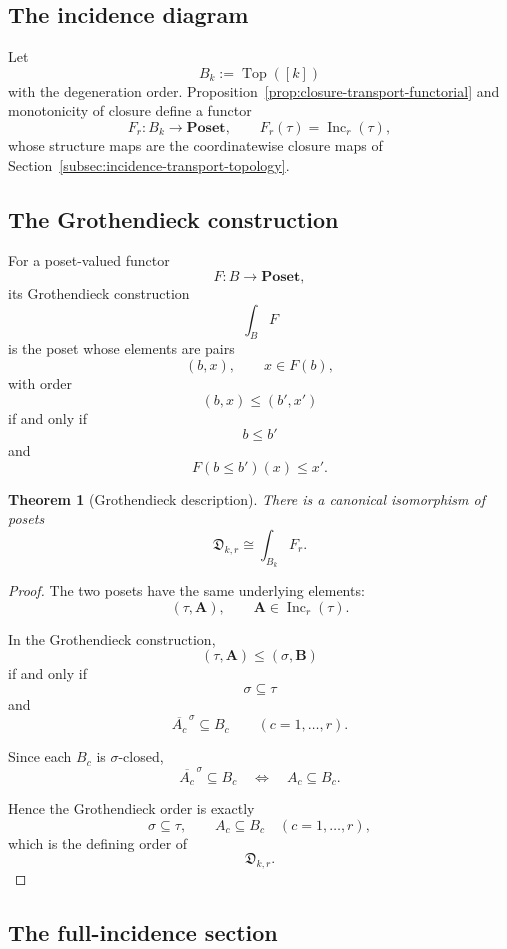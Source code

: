 \documentclass[11pt]{article}
\theoremstyle{plain}
\newtheorem{theorem}{Theorem}[section]
\theoremstyle{definition}
\begin{document}
\subsection{The incidence diagram}
\label{subsec:incidence-diagram}

Let
\[
B_k:=\operatorname{Top}([k])
\]
with the degeneration order.  Proposition~\ref{prop:closure-transport-functorial}
and monotonicity of closure define a functor
\[
F_r:B_k\longrightarrow\mathbf{Poset},
\qquad
F_r(\tau)=\operatorname{Inc}_r(\tau),
\]
whose structure maps are the coordinatewise closure maps of
Section~\ref{subsec:incidence-transport-topology}.

\subsection{The Grothendieck construction}
\label{subsec:grothendieck-construction}

For a poset-valued functor
\[
F:B\to\mathbf{Poset},
\]
its Grothendieck construction
\[
\int_BF
\]
is the poset whose elements are pairs
\[
(b,x),
\qquad
x\in F(b),
\]
with order
\[
(b,x)\leq(b',x')
\]
if and only if
\[
b\leq b'
\]
and
\[
F(b\leq b')(x)\leq x'.
\]

\begin{theorem}[Grothendieck description]
\label{thm:defect-grothendieck}
There is a canonical isomorphism of posets
\[
\mathfrak D_{k,r}
\cong
\int_{B_k}F_r.
\]
\end{theorem}

\begin{proof}
The two posets have the same underlying elements:
\[
(\tau,\mathbf A),
\qquad
\mathbf A\in\operatorname{Inc}_r(\tau).
\]

In the Grothendieck construction,
\[
(\tau,\mathbf A)
\leq
(\sigma,\mathbf B)
\]
if and only if
\[
\sigma\subseteq\tau
\]
and
\[
\overline{A_c}^{\,\sigma}
\subseteq
B_c
\qquad
(c=1,\ldots,r).
\]

Since each $B_c$ is $\sigma$-closed,
\[
\overline{A_c}^{\,\sigma}
\subseteq B_c
\quad\Longleftrightarrow\quad
A_c\subseteq B_c.
\]

Hence the Grothendieck order is exactly
\[
\sigma\subseteq\tau,
\qquad
A_c\subseteq B_c
\quad(c=1,\ldots,r),
\]
which is the defining order of
\[
\mathfrak D_{k,r}.
\]
\end{proof}


\subsection{The full-incidence section}
\label{subsec:full-incidence-section}
\end{document}
